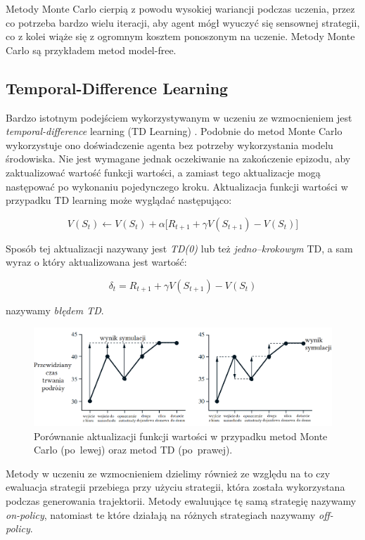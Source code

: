 \documentclass[licencjacka]{pracamgr}
\begin{document}
Metody Monte Carlo cierpią z powodu wysokiej wariancji podczas uczenia, przez co potrzeba bardzo wielu iteracji, aby agent mógł wyuczyć się sensownej strategii, co z kolei wiąże się z ogromnym kosztem ponoszonym na uczenie. Metody Monte Carlo są przykładem metod model-free.

\subsection{Temporal-Difference Learning} 

Bardzo istotnym podejściem wykorzystywanym w uczeniu ze wzmocnieniem jest \emph{temporal-difference} learning (TD Learning) \cite{TD}. Podobnie do metod Monte Carlo wykorzystuje ono doświadczenie agenta bez potrzeby wykorzystania modelu środowiska. Nie jest wymagane jednak oczekiwanie na zakończenie epizodu, aby zaktualizować wartość funkcji wartości, a zamiast tego aktualizacje mogą następować po wykonaniu pojedynczego kroku. Aktualizacja funkcji wartości w przypadku TD learning może wyglądać następująco:

$$ V(S_t) \leftarrow V(S_t) + \alpha \big[R_{t+1} + \gamma V(S_{t+1}) - V(S_t) \big] $$

Sposób tej aktualizacji nazywany jest \emph{TD(0)} lub też \emph{jedno--krokowym} TD, a sam wyraz o który aktualizowana jest wartość:

$$ \delta_t = R_{t+1} + \gamma V(S_{t+1}) - V(S_t) $$

nazywamy \emph{błędem TD}.

\begin{figure}[ht]
  \centering
  \includegraphics[width=1.0\textwidth]{mc_td}
  \caption{Porównanie aktualizacji funkcji wartości w przypadku metod Monte Carlo (po~lewej) oraz metod TD (po~prawej). \cite{Sutton}}
\end{figure}

Metody w uczeniu ze wzmocnieniem dzielimy również ze względu na to czy ewaluacja strategii przebiega przy użyciu strategii, która została wykorzystana podczas generowania trajektorii. Metody ewaluujące tę samą strategię nazywamy \emph{on-policy}, natomiast te które działają na różnych strategiach nazywamy \emph{off-policy}.
\end{document}

